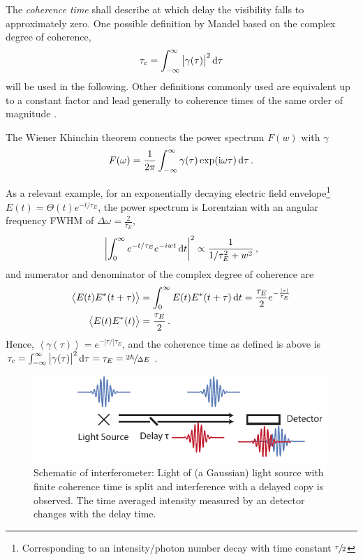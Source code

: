 The \textit{coherence time }shall describe at which delay the visibility falls to approximately zero. One possible definition by Mandel based on the complex degree of coherence,
\begin{equation}
\tau_c = \int_{-\infty}^{\infty} \left| \gamma(\tau)\right|^2 \operatorname{\mathrm{d}\!} \tau 
\end{equation} will be used in the following. Other definitions commonly used are equivalent up to a constant factor and lead generally to coherence times of the same order of magnitude \cite{mandel1959,goodman2000}. 

The Wiener Khinchin theorem connects the power spectrum $F(w)$ with $\gamma$ \cite{goodman2000,lajunen04}
\begin{equation}
	F(\omega)=\frac{1}{2 \pi} \int_{-\infty}^{\infty} \gamma(\tau) \exp (\mathrm{i} \omega \tau)  \dif \tau \,.
\end{equation}

As a relevant example, for an exponentially decaying electric field envelope\footnote{Corresponding to an intensity/photon number decay with time constant $\sfrac{\tau}{2}$} $E(t)=\Theta(t)e^{-t/\tau_E}$, the power spectrum is Lorentzian with an angular frequency FWHM of $\Delta \omega=\frac{2}{\tau_E}$,
\begin{equation*}
\left|\int_{0}^{\infty}  e^{-t/\tau_E} e^{-iwt} \dif t \right|^2 \propto  \frac{1}{1/\tau_E^2+w^2} \,,
\end{equation*}
and numerator and denominator of the complex degree of coherence are
\begin{align*}
\left\langle E(t) E^{*}(t+\tau)\right\rangle
&=\int_{0}^{\infty} E(t) E^{*}(t+\tau)\operatorname{\mathrm{d}\!} t
=\frac{\tau_E}{2}   e^{-\frac{\left| \tau \right| }{\tau_E }}\\
\left\langle E(t) E^{*}(t)\right\rangle
&=\frac{\tau_E}{2}  \,.
\end{align*}
Hence, $\left<\gamma(\tau)\right>=e^{-|\tau/| \tau_E}$,  and the coherence time as defined is above is $\tau_c=\int_{-\infty}^{\infty} \left| \gamma(\tau)\right|^2 \operatorname{\mathrm{d}\!} \tau=\tau_E=\sfrac{2\hbar}{\Delta E}$ \cite{goodman2000,pollnau2020}.



 \begin{figure}
	\centering
	\includegraphics[width=0.8\linewidth]{images/michelson.pdf}
	\caption[Schematic of interferometer]{Schematic of interferometer: Light of (a Gaussian) light source with finite coherence time is split and interference with a delayed copy is observed. The time averaged intensity measured by an detector changes with the delay time. }
	\label{fig:michelson}
\end{figure}


